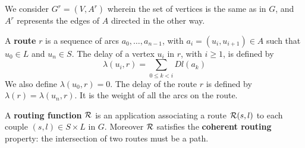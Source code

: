 \documentclass[a4paper,10pt]{article}
\begin{document}
      We consider $G^r=(V,A^r)$ wherein the set of vertices is the same as in $G$, and $A^r$ represents the edges of $A$ directed in the other way. 
      \newline
      \begin{center}
      \end{center}

      A {\bf route} $r$ is a sequence of arcs $a_0, \ldots , a_{n-1}$, with $a_i=(u_i,u_{i+1}) \in A$ such that $u_0 \in L$ and $u_n \in S$.
      The delay of a vertex $u_i$ in $r$, with $i \geq 1$, is defined by $$\lambda(u_i,r)= \sum\limits_{0 \leq k <i} Dl(a_k)$$ We also define $\lambda(u_0,r)=0$.
      The delay of the route $r$ is defined by $\lambda (r)= \lambda (u_n,r)$. It is the weight of all the arcs on the route.

      A {\bf routing function}  ${\cal R}$ is an application associating a route  ${\cal R}(s,l)$ to each couple $(s,l) \in S \times L$ in $G$.
      Moreover ${\cal R}$ satisfies the {\bf coherent routing} property: the intersection of two routes must be a path.
\end{document}

